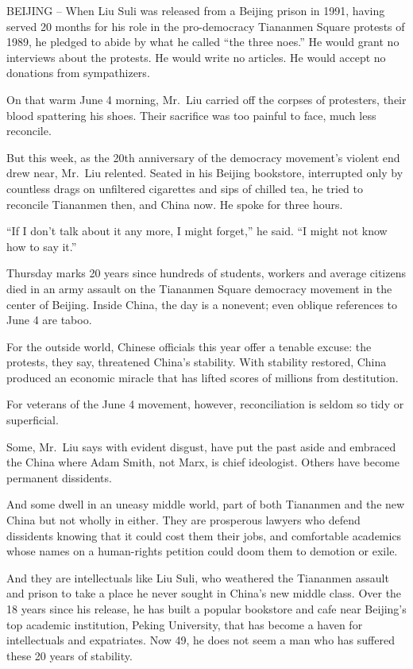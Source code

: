 \documentclass[12pt,a4paper,onecolumn]{article}
\begin{document}
BEIJING -- When Liu Suli was released from a Beijing prison in 1991, having served 20 months for his
role in the pro-democracy Tiananmen Square protests of 1989, he pledged to abide by what he called
``the three noes.'' He would grant no interviews about the protests. He would write no articles. He
would accept no donations from sympathizers.

On that warm June 4 morning, Mr.~Liu carried off the corpses of protesters, their blood spattering
his shoes. Their sacrifice was too painful to face, much less reconcile.

But this week, as the 20th anniversary of the democracy movement's violent end drew near, Mr.~Liu
relented. Seated in his Beijing bookstore, interrupted only by countless drags on unfiltered
cigarettes and sips of chilled tea, he tried to reconcile Tiananmen then, and China now. He spoke
for three hours.

``If I don't talk about it any more, I might forget,'' he said. ``I might not know how to say it.''

Thursday marks 20 years since hundreds of students, workers and average citizens died in an army
assault on the Tiananmen Square democracy movement in the center of Beijing. Inside China, the day
is a nonevent; even oblique references to June 4 are taboo.

For the outside world, Chinese officials this year offer a tenable excuse: the protests, they say,
threatened China's stability. With stability restored, China produced an economic miracle that has
lifted scores of millions from destitution.

For veterans of the June 4 movement, however, reconciliation is seldom so tidy or superficial.

Some, Mr.~Liu says with evident disgust, have put the past aside and embraced the China where Adam
Smith, not Marx, is chief ideologist. Others have become permanent dissidents.

And some dwell in an uneasy middle world, part of both Tiananmen and the new China but not wholly in
either. They are prosperous lawyers who defend dissidents knowing that it could cost them their
jobs, and comfortable academics whose names on a human-rights petition could doom them to demotion
or exile.

And they are intellectuals like Liu Suli, who weathered the Tiananmen assault and prison to take a
place he never sought in China's new middle class. Over the 18 years since his release, he has built
a popular bookstore and cafe near Beijing's top academic institution, Peking University, that has
become a haven for intellectuals and expatriates. Now 49, he does not seem a man who has suffered
these 20 years of stability.
\end{document}

